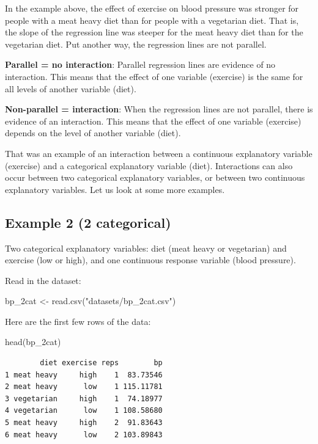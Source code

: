 \documentclass[
  letterpaper,
  8pt,
  a4paper]{book}
\newenvironment{Shaded}{\begin{snugshade}}{\end{snugshade}}
\newcommand{\FunctionTok}[1]{\textcolor[rgb]{0.28,0.35,0.67}{#1}}
\newcommand{\NormalTok}[1]{\textcolor[rgb]{0.00,0.23,0.31}{#1}}
\newcommand{\OtherTok}[1]{\textcolor[rgb]{0.00,0.23,0.31}{#1}}
\newcommand{\StringTok}[1]{\textcolor[rgb]{0.13,0.47,0.30}{#1}}
\begin{document}
In the example above, the effect of exercise on blood pressure was
stronger for people with a meat heavy diet than for people with a
vegetarian diet. That is, the slope of the regression line was steeper
for the meat heavy diet than for the vegetarian diet. Put another way,
the regression lines are not parallel.

\textbf{Parallel = no interaction}: Parallel regression lines are
evidence of no interaction. This means that the effect of one variable
(exercise) is the same for all levels of another variable (diet).

\textbf{Non-parallel = interaction}: When the regression lines are not
parallel, there is evidence of an interaction. This means that the
effect of one variable (exercise) depends on the level of another
variable (diet).

That was an example of an interaction between a continuous explanatory
variable (exercise) and a categorical explanatory variable (diet).
Interactions can also occur between two categorical explanatory
variables, or between two continuous explanatory variables. Let us look
at some more examples.

\subsection*{Example 2 (2 categorical)}\label{example-2-2-categorical}

Two categorical explanatory variables: diet (meat heavy or vegetarian)
and exercise (low or high), and one continuous response variable (blood
pressure).

Read in the dataset:

\begin{Shaded}
\begin{Highlighting}[]
\NormalTok{bp\_2cat }\OtherTok{\textless{}{-}} \FunctionTok{read.csv}\NormalTok{(}\StringTok{"datasets/bp\_2cat.csv"}\NormalTok{)}
\end{Highlighting}
\end{Shaded}

Here are the first few rows of the data:

\begin{Shaded}
\begin{Highlighting}[]
\FunctionTok{head}\NormalTok{(bp\_2cat)}
\end{Highlighting}
\end{Shaded}

\begin{verbatim}
        diet exercise reps        bp
1 meat heavy     high    1  83.73546
2 meat heavy      low    1 115.11781
3 vegetarian     high    1  74.18977
4 vegetarian      low    1 108.58680
5 meat heavy     high    2  91.83643
6 meat heavy      low    2 103.89843
\end{verbatim}
\end{document}
